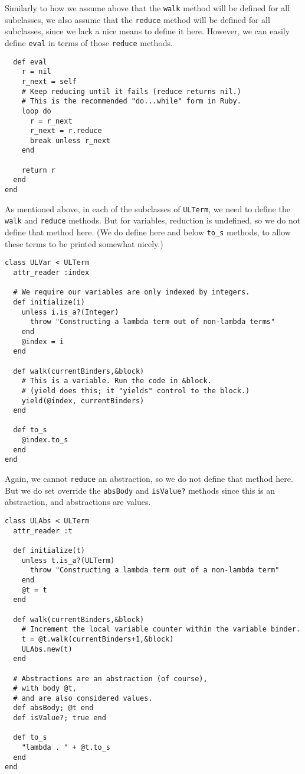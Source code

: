 \documentclass[11pt]{article}
\theoremstyle{definition}
\begin{document}
Similarly to how we assume above that the \texttt{walk} method
will be defined for all subclasses, we also assume
that the \texttt{reduce} method will be defined for all subclasses,
since we lack a nice means to define it here.
However, we can easily define \texttt{eval} in terms of those \texttt{reduce} methods.
\begin{verbatim}
  def eval
    r = nil
    r_next = self
    # Keep reducing until it fails (reduce returns nil.)
    # This is the recommended "do...while" form in Ruby.
    loop do
      r = r_next
      r_next = r.reduce
      break unless r_next
    end

    return r
  end
end
\end{verbatim}

As mentioned above, in each of the subclasses of \texttt{ULTerm},
we need to define the \texttt{walk} and \texttt{reduce} methods.
But for variables, reduction is undefined, so we
do not define that method here.
(We do define here and below \texttt{to\_s} methods, to allow
these terms to be printed somewhat nicely.)
\begin{verbatim}
class ULVar < ULTerm
  attr_reader :index

  # We require our variables are only indexed by integers.
  def initialize(i)
    unless i.is_a?(Integer)
      throw "Constructing a lambda term out of non-lambda terms"
    end
    @index = i
  end
  
  def walk(currentBinders,&block)
    # This is a variable. Run the code in &block.
    # (yield does this; it "yields" control to the block.)
    yield(@index, currentBinders)
  end

  def to_s
    @index.to_s
  end
end
\end{verbatim}

Again, we cannot \texttt{reduce} an abstraction,
so we do not define that method here.
But we do set override the \texttt{absBody} and \texttt{isValue?} methods
since this is an abstraction, and abstractions are values.
\begin{verbatim}
class ULAbs < ULTerm
  attr_reader :t

  def initialize(t)
    unless t.is_a?(ULTerm)
      throw "Constructing a lambda term out of a non-lambda term"
    end
    @t = t
  end
  
  def walk(currentBinders,&block)
    # Increment the local variable counter within the variable binder.
    t = @t.walk(currentBinders+1,&block)
    ULAbs.new(t)
  end

  # Abstractions are an abstraction (of course),
  # with body @t,
  # and are also considered values.
  def absBody; @t end
  def isValue?; true end
  
  def to_s
    "lambda . " + @t.to_s
  end
end
\end{verbatim}
\end{document}
